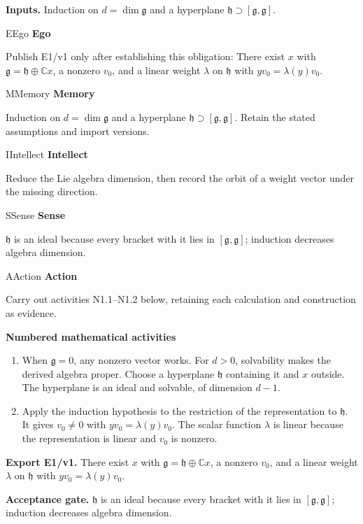 \documentclass[preprint,12pt,aps,pra,showkeys,amsmath,amssymb,superscriptaddress,floatfix]{revtex4-2}
\theoremstyle{definition}
\theoremstyle{remark}
\newcommand{\mmfaculty}[3]{%
 \begin{mmfacultybox}{#1}{#2}
 {\sffamily\bfseries\color{MMBlue}#2}\par\smallskip #3
 \end{mmfacultybox}}
\newcommand{\field}[2]{\par\smallskip\noindent\textbf{#1.} #2\par}
\begin{document}
\field{Inputs}{Induction on \(d=\dim\mathfrak g\) and a hyperplane
\(\mathfrak h\supset[\mathfrak g,\mathfrak g]\).}

\mmfaculty{E}{Ego}{Publish E1/v1 only after establishing this obligation: There exist \(x\)
with \(\mathfrak g=\mathfrak h\oplus\mathbb Cx\), a nonzero \(v_0\), and
a linear weight \(\lambda\) on \(\mathfrak h\) with
\(yv_0=\lambda(y)v_0\).}

\mmfaculty{M}{Memory}{Induction on \(d=\dim\mathfrak g\) and a hyperplane
\(\mathfrak h\supset[\mathfrak g,\mathfrak g]\). Retain the stated
assumptions and import versions.}

\mmfaculty{I}{Intellect}{Reduce the Lie algebra dimension, then record the orbit of a weight
vector under the missing direction.}

\mmfaculty{S}{Sense}{\(\mathfrak h\) is an ideal because every bracket with it lies in
\([\mathfrak g,\mathfrak g]\); induction decreases algebra dimension.}

\mmfaculty{A}{Action}{Carry out activities N1.1--N1.2 below, retaining each calculation and
construction as evidence.}

\smallskip\noindent\textbf{Numbered mathematical activities}

\begin{enumerate}[label=N1.\arabic*,leftmargin=3.4em]

\item When \(\mathfrak g=0\), any nonzero vector works. For \(d>0\),
solvability makes the derived algebra proper. Choose a hyperplane
\(\mathfrak h\) containing it and \(x\) outside. The hyperplane is an
ideal and solvable, of dimension \(d-1\).

\item Apply the induction hypothesis to the restriction of the representation
to \(\mathfrak h\). It gives \(v_0\ne0\) with \(yv_0=\lambda(y)v_0\).
The scalar function \(\lambda\) is linear because the representation is
linear and \(v_0\) is nonzero.

\end{enumerate}

\field{Export E1/v1}{There exist \(x\) with \(\mathfrak g=\mathfrak h\oplus\mathbb Cx\), a
nonzero \(v_0\), and a linear weight \(\lambda\) on \(\mathfrak h\) with
\(yv_0=\lambda(y)v_0\).}

\field{Acceptance gate}{\(\mathfrak h\) is an ideal because every bracket with it lies in
\([\mathfrak g,\mathfrak g]\); induction decreases algebra dimension.}
\end{document}
